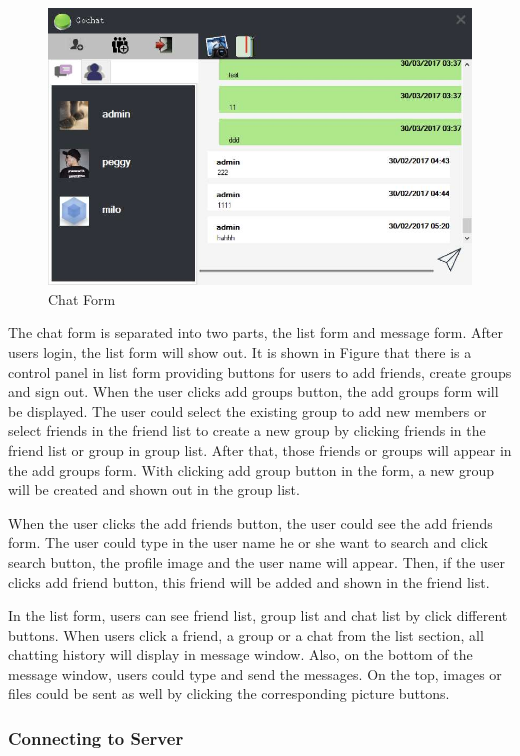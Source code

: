\documentclass[a4paper,11pt]{article}
\begin{document}
\begin{figure}[h!]
\centering
\includegraphics[width = 0.5 \textwidth ]{message.jpg}
\caption{\label{fig:UML}Chat Form}
\end{figure}

The chat form is separated into two parts, the list form and message form. After users login, the list form will show out. It is shown in Figure that there is a control panel in list form providing buttons for users to add friends, create groups and sign out. When the user clicks add groups button, the add groups form will be displayed. The user could select the existing group to add new members or select friends in the friend list to create a new group by clicking friends in the friend list or group in group list. After that, those friends or groups will appear in the add groups form. With clicking add group button in the form, a new group will be created and shown out in the group list. 

When the user clicks the add friends button, the user could see the add friends form. The user could type in the user name he or she want to search and click search button, the profile image and the user name will appear. Then, if the user clicks add friend button, this friend will be added and shown in the friend list.

In the list form, users can see friend list, group list and chat list by click different buttons. When users click a friend, a group or a chat from the list section, all chatting history will display in message window. Also, on the bottom of the message window, users could type and send the messages. On the top, images or files could be sent as well by clicking the corresponding picture buttons. 

\subsubsection{Connecting to Server}
\end{document}
